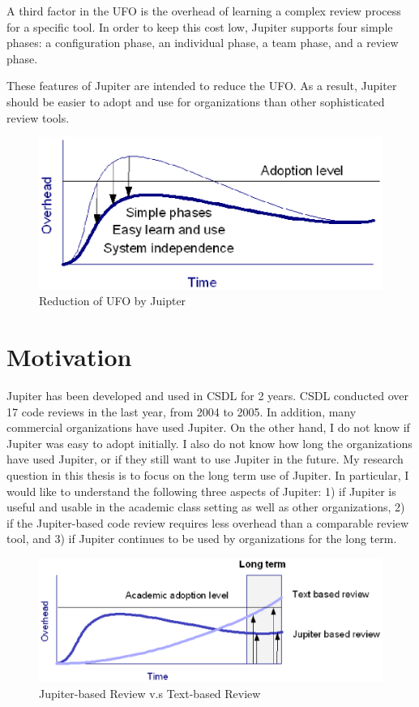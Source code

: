 A third factor in the UFO is the overhead of learning a complex review process for a specific tool.  In order to keep this cost low, Jupiter supports four simple phases: a configuration phase, an individual phase, a team phase, and a review phase.

These features of Jupiter are intended to reduce the UFO. As a result, Jupiter should be easier to adopt and use for organizations than other sophisticated review tools. 

\begin{figure}[htbp]
  \centering
  \includegraphics{images/fig1-6.eps}
  \caption{Reduction of UFO by Juipter}
  \label{fig1-6}
\end{figure}

\section{Motivation}
\label{sec:motivation}

Jupiter has been developed and used in CSDL for 2 years. CSDL conducted over 17 code reviews in the last year, from 2004 to 2005. In addition, many commercial organizations have used Jupiter. On the other hand, I do not know if Jupiter was easy to adopt initially. I also do not know how long the organizations have used Jupiter, or if they still want to use Jupiter in the future. My research question in this thesis is to focus on the long term use of Jupiter. In particular, I would like to understand the following three aspects of Jupiter: 1) if Jupiter is useful and usable in the academic class setting as well as other organizations, 2) if the Jupiter-based code review requires less overhead than a comparable review tool, and 3) if Jupiter continues to be used by organizations for the long term.

\begin{figure}[htbp]
  \centering
  \includegraphics{images/fig1-7.eps}
  \caption{Jupiter-based Review v.s Text-based Review}
  \label{fig1-7}
\end{figure}

